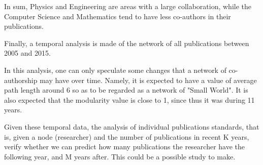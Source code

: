 \documentclass{article}
\begin{document}
\begin{multicols}{2}
In sum, Physics and Engineering are areas with a large collaboration, while the Computer Science and Mathematics tend to have less co-authors in their publications.

Finally, a temporal analysis is made of the network of all publications between 2005 and 2015. 


In this analysis, one can only speculate some changes that a network of co-authorship may have over time. Namely, it is expected to have a value of average path length around 6 so as to be regarded as a network of "Small World". It is also expected that the modularity value is close to 1, since thus it was during 11 years.

Given these temporal data, the analysis of individual publications standards, that is, given a node (researcher) and the number of publications in recent K years, verify whether we can predict how many publications the researcher have the following year, and M years after. This could be a possible study to make.






\end{multicols}
\end{document}
